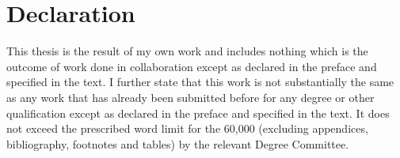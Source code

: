 \chapter{Declaration}
This thesis is the result of my own work and includes nothing which is the outcome of work done in collaboration except as declared in the preface and specified in the text. I further state that this work is not substantially the same as any work that has already been submitted before for any degree or other qualification except as declared in the preface and specified in the text. It does not exceed the prescribed word limit for the 60,000 (excluding appendices, bibliography, footnotes and tables) by the relevant Degree Committee.



